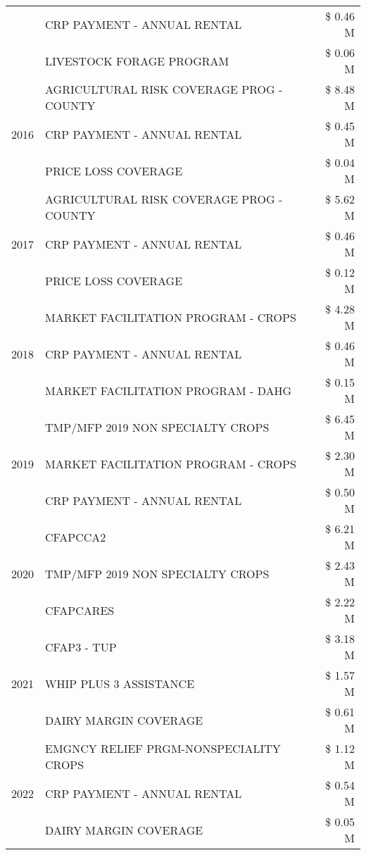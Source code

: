 \begin{tabular}{llr}
 & CRP PAYMENT - ANNUAL RENTAL & \$ 0.46 M \\
 & LIVESTOCK FORAGE PROGRAM & \$ 0.06 M \\
\cline{1-3}
\multirow[t]{3}{*}{2016} & AGRICULTURAL RISK COVERAGE PROG - COUNTY & \$ 8.48 M \\
 & CRP PAYMENT - ANNUAL RENTAL & \$ 0.45 M \\
 & PRICE LOSS COVERAGE & \$ 0.04 M \\
\cline{1-3}
\multirow[t]{3}{*}{2017} & AGRICULTURAL RISK COVERAGE PROG - COUNTY & \$ 5.62 M \\
 & CRP PAYMENT - ANNUAL RENTAL & \$ 0.46 M \\
 & PRICE LOSS COVERAGE & \$ 0.12 M \\
\cline{1-3}
\multirow[t]{3}{*}{2018} & MARKET FACILITATION PROGRAM - CROPS & \$ 4.28 M \\
 & CRP PAYMENT - ANNUAL RENTAL & \$ 0.46 M \\
 & MARKET FACILITATION PROGRAM - DAHG & \$ 0.15 M \\
\cline{1-3}
\multirow[t]{3}{*}{2019} & TMP/MFP 2019 NON SPECIALTY CROPS & \$ 6.45 M \\
 & MARKET FACILITATION PROGRAM - CROPS & \$ 2.30 M \\
 & CRP PAYMENT - ANNUAL RENTAL & \$ 0.50 M \\
\cline{1-3}
\multirow[t]{3}{*}{2020} & CFAPCCA2 & \$ 6.21 M \\
 & TMP/MFP 2019 NON SPECIALTY CROPS & \$ 2.43 M \\
 & CFAPCARES & \$ 2.22 M \\
\cline{1-3}
\multirow[t]{3}{*}{2021} & CFAP3 - TUP & \$ 3.18 M \\
 & WHIP PLUS 3 ASSISTANCE & \$ 1.57 M \\
 & DAIRY MARGIN COVERAGE & \$ 0.61 M \\
\cline{1-3}
\multirow[t]{3}{*}{2022} & EMGNCY RELIEF PRGM-NONSPECIALITY CROPS & \$ 1.12 M \\
 & CRP PAYMENT - ANNUAL RENTAL & \$ 0.54 M \\
 & DAIRY MARGIN COVERAGE & \$ 0.05 M \\
\cline{1-3}
\bottomrule
\end{tabular}
